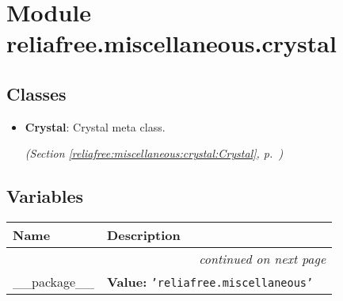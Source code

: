 %
%
%


\section{Module reliafree.miscellaneous.crystal}

    \label{reliafree:miscellaneous:crystal}


\subsection{Classes}

\begin{itemize}  \setlength{\parskip}{0ex}
  \item \textbf{Crystal}: Crystal meta class.



  \textit{(Section \ref{reliafree:miscellaneous:crystal:Crystal}, p.~\pageref{reliafree:miscellaneous:crystal:Crystal})}

\end{itemize}


  \subsection{Variables}

    \vspace{-1cm}
\hspace{\varindent}\begin{longtable}{|p{\varnamewidth}|p{\vardescrwidth}|l}
\cline{1-2}
\cline{1-2} \centering \textbf{Name} & \centering \textbf{Description}& \\
\cline{1-2}
\endhead\cline{1-2}\multicolumn{3}{r}{\small\textit{continued on next page}}\\\endfoot\cline{1-2}
\endlastfoot\raggedright \_\-\_\-p\-a\-c\-k\-a\-g\-e\-\_\-\_\- & \raggedright \textbf{Value:} 
{\tt \texttt{'}\texttt{reliafree.miscellaneous}\texttt{'}}&\\
\cline{1-2}
\end{longtable}

